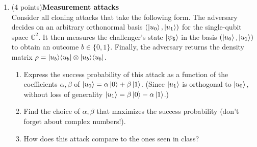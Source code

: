 \documentclass[12pt]{article}
\begin{document}
\begin{enumerate}
\item (4 points){\bf Measurement attacks}\\
Consider all cloning attacks that take the following form. The adversary decides on an arbitrary orthonormal basis $(\ket{u_0},\ket{u_1})$ for the single-qubit space $\mathbb{C}^2$. It then measures the challenger's state $\ket{\psi_\$}$ in the basis $(\ket{u_0},\ket{u_1})$ to obtain an outcome $b\in\{0,1\}$. Finally, the adversary returns the density matrix $\rho = \ket{u_b}\!\bra{u_b}\otimes \ket{u_b}\!\bra{u_b}$. 
\begin{enumerate}
\item Express the success probability of this attack as a function of the coefficients $\alpha,\beta$ of $\ket{u_0} = \alpha \ket{0} + \beta\ket{1}$. (Since $\ket{u_1}$ is orthogonal to $\ket{u_0}$, without loss of generality $\ket{u_1} = \beta\ket{0} - \alpha \ket{1}$.) 
\item Find the choice of $\alpha,\beta$ that maximizes the success probability (don't forget about complex numbers!). 
\item How does this attack compare to the ones seen in class?
\end{enumerate}




\end{enumerate}
\end{document}
